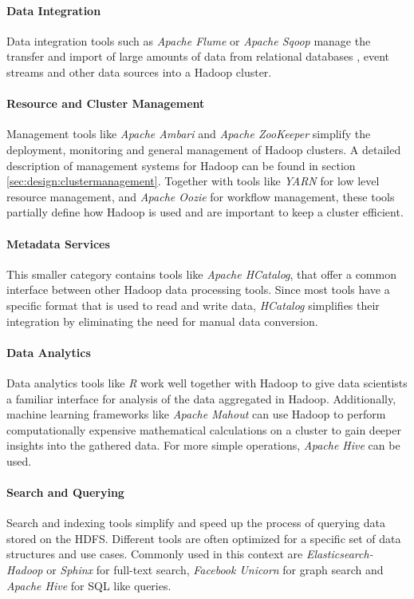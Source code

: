 \paragraph{Data Integration}
Data integration tools such as \emph{Apache Flume} or \emph{Apache Sqoop} manage the transfer 
and import of large amounts of data from relational databases \autocite{apache2018sqoop}, 
event streams and other data sources \autocite{apache2017flume} into a Hadoop cluster.

\paragraph{Resource and Cluster Management}
Management tools like \emph{Apache Ambari} and \emph{Apache ZooKeeper} simplify the deployment, 
monitoring and general management of Hadoop clusters. A detailed description of management systems for Hadoop can be found in section \vref{sec:design:clustermanagement}.
Together with tools like \emph{\ac{YARN}} for low level resource management, 
and \emph{Apache Oozie} for workflow management, these tools partially define how Hadoop is used 
and are important to keep a cluster efficient.

\paragraph{Metadata Services}
This smaller category contains tools like \emph{Apache HCatalog}, 
that offer a common interface between other Hadoop data processing tools. 
Since most tools have a specific format that is used to read and write data, 
\emph{HCatalog} simplifies their integration by eliminating 
the need for manual data conversion.\autocite{bmc2017hcatalog}

\paragraph{Data Analytics}
Data analytics tools like \emph{R} work well together with Hadoop to give data scientists 
a familiar interface for analysis of the data aggregated in Hadoop. 
Additionally, machine learning frameworks like \emph{Apache Mahout} can use Hadoop 
to perform computationally expensive mathematical calculations 
on a cluster to gain deeper insights into the gathered data. 
For more simple operations, \emph{Apache Hive} can be used.

\paragraph{Search and Querying}
Search and indexing tools simplify and speed up the process of querying data stored on the \ac{HDFS}. Different tools are often optimized for a specific set of data structures and use cases. Commonly used in this context are \emph{Elasticsearch-Hadoop} or \emph{Sphinx} for full-text search, \emph{Facebook Unicorn} for graph search and \emph{Apache Hive} for \ac{SQL} like queries.


